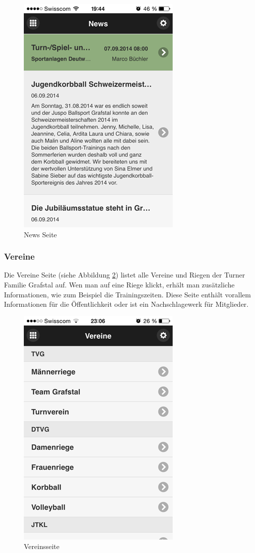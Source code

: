 \begin{figure}[h]
\centering
\includegraphics[scale=0.5]{images/app/news.png}
\caption{News Seite}
\label{fig:app_news}
\end{figure}

\FloatBarrier
\subsubsection{Vereine}
Die Vereine Seite (siehe Abbildung \ref{fig:app_vereine})  listet alle Vereine und Riegen der Turner Familie Grafstal auf. Wen man auf eine Riege klickt, erhält man zusätzliche Informationen, wie zum Beispiel die Trainingszeiten. Diese Seite enthält vorallem Informationen für die Öffentlichkeit oder ist ein Nachschlagewerk für Mitglieder.


\begin{figure}[h]
\centering
\includegraphics[scale=0.5]{images/app/vereine.png}
\caption{Vereinsseite}
\label{fig:app_vereine}
\end{figure}


